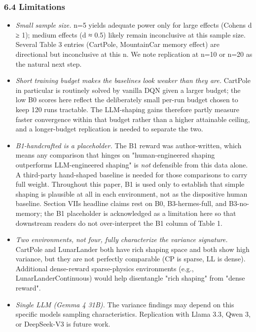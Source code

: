 \subsubsection{6.4 Limitations}\label{64-limitations}

\begin{itemize}
\tightlist
\item
  \emph{Small sample size.} n=5 yields adequate power only for large effects (Cohen\textquotesingle s d ≥ 1); medium effects (d ≈ 0.5) likely remain inconclusive at this sample size. Several Table 3 entries (CartPole, MountainCar memory effect) are directional but inconclusive at this n. We note replication at n=10 or n=20 as the natural next step.
\item
  \emph{Short training budget makes the baselines look weaker than they are.} CartPole in particular is routinely solved by vanilla DQN given a larger budget; the low B0 scores here reflect the deliberately small per-run budget chosen to keep 120 runs tractable. The LLM-shaping gains therefore partly measure faster convergence within that budget rather than a higher attainable ceiling, and a longer-budget replication is needed to separate the two.
\item
  \emph{B1-handcrafted is a placeholder.} The B1 reward was author-written, which means any comparison that hinges on "human-engineered shaping outperforms LLM-engineered shaping" is \emph{not} defensible from this data alone. A third-party hand-shaped baseline is needed for those comparisons to carry full weight. Throughout this paper, B1 is used only to establish that simple shaping is plausible at all in each environment, not as the dispositive human baseline. Section VII\textquotesingle s headline claims rest on B0, B3-hermes-full, and B3-no-memory; the B1 placeholder is acknowledged as a limitation here so that downstream readers do not over-interpret the B1 column of Table 1.
\item
  \emph{Two environments, not four, fully characterize the variance signature.} CartPole and LunarLander both have rich shaping space and both show high variance, but they are not perfectly comparable (CP is sparse, LL is dense). Additional dense-reward sparse-physics environments (e.g., LunarLanderContinuous) would help disentangle "rich shaping" from "dense reward".
\item
  \emph{Single LLM (Gemma 4 31B).} The variance findings may depend on this specific model\textquotesingle s sampling characteristics. Replication with Llama 3.3, Qwen 3, or DeepSeek-V3 is future work.

\end{itemize}
